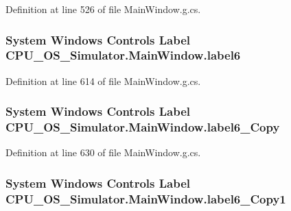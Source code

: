 Definition at line 526 of file Main\+Window.\+g.\+cs.

\hypertarget{class_c_p_u___o_s___simulator_1_1_main_window_a8f210008776bb163b4c2c2b160aa52be}{}
\subsubsection[{label6}]{\setlength{\rightskip}{0pt plus 5cm}System Windows Controls Label C\+P\+U\+\_\+\+O\+S\+\_\+\+Simulator.\+Main\+Window.\+label6\hspace{0.3cm}{\ttfamily [package]}}\label{class_c_p_u___o_s___simulator_1_1_main_window_a8f210008776bb163b4c2c2b160aa52be}


Definition at line 614 of file Main\+Window.\+g.\+cs.

\hypertarget{class_c_p_u___o_s___simulator_1_1_main_window_a18612502a8ab2d53d85434e426785022}{}
\subsubsection[{label6\+\_\+\+Copy}]{\setlength{\rightskip}{0pt plus 5cm}System Windows Controls Label C\+P\+U\+\_\+\+O\+S\+\_\+\+Simulator.\+Main\+Window.\+label6\+\_\+\+Copy\hspace{0.3cm}{\ttfamily [package]}}\label{class_c_p_u___o_s___simulator_1_1_main_window_a18612502a8ab2d53d85434e426785022}


Definition at line 630 of file Main\+Window.\+g.\+cs.

\hypertarget{class_c_p_u___o_s___simulator_1_1_main_window_a890bd54d36af19ec881b6a840d6ac8a9}{}
\subsubsection[{label6\+\_\+\+Copy1}]{\setlength{\rightskip}{0pt plus 5cm}System Windows Controls Label C\+P\+U\+\_\+\+O\+S\+\_\+\+Simulator.\+Main\+Window.\+label6\+\_\+\+Copy1\hspace{0.3cm}{\ttfamily [package]}}\label{class_c_p_u___o_s___simulator_1_1_main_window_a890bd54d36af19ec881b6a840d6ac8a9}



